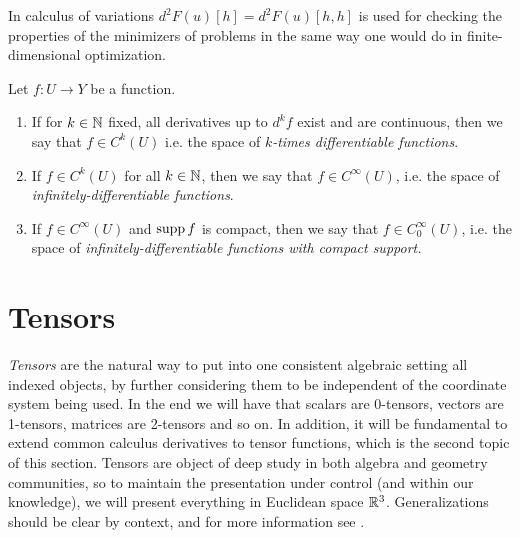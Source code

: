 
In calculus of variations $d^2 F(u)[h] = d^2 F(u)[h,h]$ is used for checking the properties of the minimizers of problems in the same way one would do in finite-dimensional optimization.

\begin{definition}
    Let $f:U\to Y$ be a function. 
    \begin{enumerate}
        \item If for $k\in \mathbb{N}$ fixed, all derivatives up to $d^k f$ exist and are continuous, then we say that $f\in C^k(U)$ i.e. the space of \emph{$k$-times differentiable functions}.
        \item If $f\in C^k(U)$ for all $k\in \mathbb{N}$, then we say that $f\in C^\infty(U)$, i.e. the space of \emph{infinitely-differentiable functions}.
        \item If $f\in C^\infty(U)$ and $\operatorname{\text{supp}} f$ is compact, then we say that $f\in C_0^\infty(U)$, i.e. the space of \emph{infinitely-differentiable functions with compact support.}
    \end{enumerate}
\end{definition}

\section{Tensors}\label{sec:tensors}
\emph{Tensors} are the natural way to put into one consistent algebraic setting all indexed objects, by further considering them to be independent of the coordinate system being used. In the end we will have that scalars are 0-tensors, vectors are 1-tensors, matrices are 2-tensors and so on. In addition, it will be fundamental to extend common calculus derivatives to tensor functions, which is the second topic of this section. Tensors are object of deep study in both algebra and geometry communities, so to maintain the presentation under control (and within our knowledge), we will present everything in Euclidean space $\mathbb{R}^3$. Generalizations should be clear by context, and for more information see  \cite{holzapfel2002nonlinear}.


